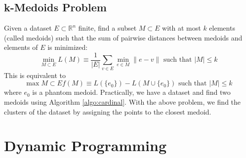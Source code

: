 \documentclass[11pt, openany]{report}
\newcommand{\R}{\mathbb{R}}
\theoremstyle{definition}
\begin{document}
\section{k-Medoids Problem}
Given a dataset $E\subset \R^n$ finite, find a subset $M\subset E$ with at most $k$ elements (called medoids) such that the sum of pairwise distances between medoids and elements of $E$ is minimized:
\begin{equation}
    \min_{M\subset E} L(M)\equiv \frac{1}{|E|}\sum_{v\in E} \min_{e\in M}\lVert e-v\rVert \text{    such that    } |M|\le k
\end{equation}
This is equivalent to 
\begin{equation}
    \max{M\subset E} f(M)\equiv L(\{e_0\})-L(M\cup \{e_0\})\text{    such that    } |M|\le k
\end{equation}
where $e_0$ is a phantom medoid. Practically, we have a dataset and find two medoids using Algorithm \ref{algo:cardinal}. With the above problem, we find the clusters of the dataset by assigning the points to the closest medoid. 
\chapter{Dynamic Programming}
\end{document}
